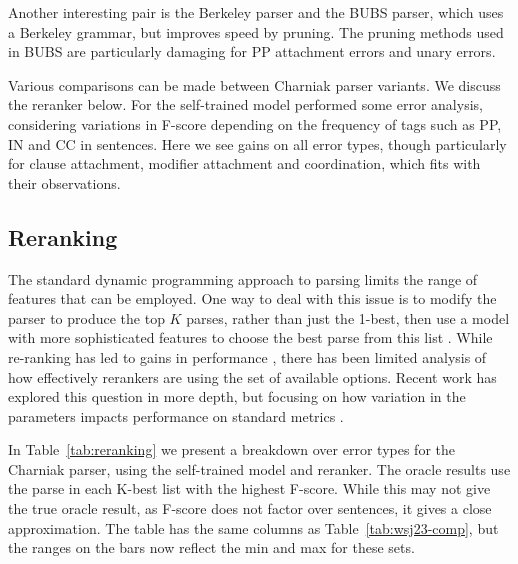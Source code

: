 Another interesting pair is the Berkeley parser and the BUBS parser, which uses
a Berkeley grammar, but improves speed by pruning.  The pruning methods used in
BUBS are particularly damaging for PP attachment errors and unary errors.

Various comparisons can be made between Charniak parser variants.  We discuss
the reranker below.  For the self-trained model
\textcite{McClosky-Charniak-Johnson:2006} performed some error analysis,
considering variations in F-score depending on the frequency of tags such as
PP, IN and CC in sentences.  Here we see gains on all error types, though
particularly for clause attachment, modifier attachment and coordination, which
fits with their observations.

\subsection{Reranking}

The standard dynamic programming approach to parsing limits the range of
features that can be employed.  One way to deal with this issue is to modify
the parser to produce the top $K$ parses, rather than just the 1-best, then use
a model with more sophisticated features to choose the best parse from this
list \parencite{collins:00}.  While re-ranking has led to gains in performance
\parencite{Charniak-Johnson:2005}, there has been limited analysis of how
effectively rerankers are using the set of available options.  Recent work has
explored this question in more depth, but focusing on how variation in the
parameters impacts performance on standard metrics
\parencite{huang:08a,Ng-etal:2010,Auli-Lopez:2011,Ng-Curran:2012}.

\begin{landscape}

\end{landscape}

In Table~\ref{tab:reranking} we present a breakdown over error types for the
Charniak parser, using the self-trained model and reranker.  The oracle results
use the parse in each K-best list with the highest F-score.  While this may not
give the true oracle result, as F-score does not factor over sentences, it
gives a close approximation.  The table has the same columns as
Table~\ref{tab:wsj23-comp}, but the ranges on the bars now reflect the min and
max for these sets.

